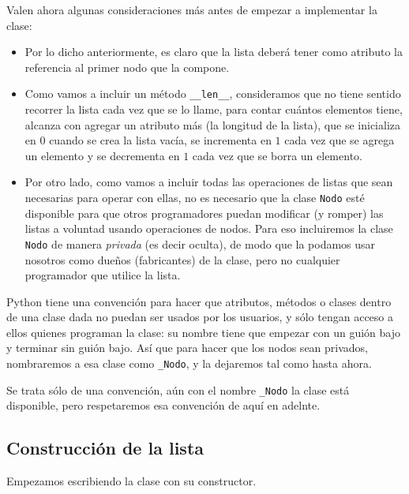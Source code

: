 Valen ahora algunas consideraciones más antes de empezar a implementar la clase:

\begin{itemize}

\item Por lo dicho anteriormente, es claro que la lista deberá tener como
atributo la referencia al primer nodo que la compone.

\item Como vamos a incluir un método \lstinline|__len__|, consideramos que no
tiene sentido recorrer la lista cada vez que se lo llame, para contar
cuántos elementos tiene, alcanza con agregar un atributo más (la longitud
de la lista), que se inicializa en $0$ cuando se crea la lista vacía, se
incrementa en $1$ cada vez que se agrega un elemento y se decrementa en $1$
cada vez que se borra un elemento.

\item Por otro lado, como vamos a incluir todas las operaciones de listas
que sean necesarias para operar con ellas, no es necesario que la clase
\lstinline!Nodo! esté disponible para que otros programadores puedan
modificar (y romper) las listas a voluntad usando operaciones de nodos. Para eso
incluiremos la clase \lstinline!Nodo! de manera {\it privada} (es
decir oculta), de modo que la podamos usar nosotros como dueños
(fabricantes) de la clase, pero no cualquier programador que utilice la
lista.
\end{itemize}

Python tiene una convención para hacer que atributos, métodos o clases
dentro de una clase dada no puedan ser usados por los usuarios, y sólo
tengan acceso a ellos quienes programan la clase: su nombre tiene que
empezar con un guión bajo y terminar sin guión bajo. Así que para hacer que
los nodos sean privados, nombraremos a esa clase como \lstinline|_Nodo|, y
la dejaremos tal como hasta ahora.

\begin{observacion}
Se trata sólo de una convención, aún con el nombre \lstinline!_Nodo! la
clase está disponible, pero respetaremos esa convención de aquí en adelnte.
\end{observacion}

\subsection{Construcción de la lista}

Empezamos escribiendo la clase con su constructor.

